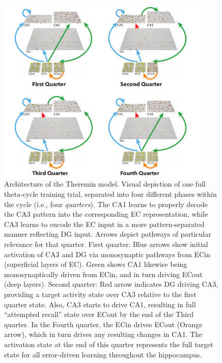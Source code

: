 \documentclass[11pt,twoside]{article}
\newif\myifpdf
\begin{document}
\begin{figure}
  \centering\includegraphics[width=4in]{fig_hip_edl_model}
  \caption{\footnotesize Architecture of the Theremin model. Visual depiction of one full theta-cycle training trial, separated into four different phases within the cycle (i.e., four \emph{quarters}).  The CA1 learns to properly decode the CA3 pattern into the corresponding EC representation, while CA3 learns to encode the EC input in a more pattern-separated manner reflecting DG input.  Arrows depict pathways of particular relevance for that quarter.  First quarter: Blue arrows show initial activation of CA3 and DG via monosynaptic pathways from ECin (superficial layers of EC).  Green shows CA1 likewise being monosynaptically driven from ECin, and in turn driving ECout (deep layers).  Second quarter: Red arrow indicates DG driving CA3, providing a target activity state over CA3 relative to the first quarter state.  Also, CA3 starts to drive CA1, resulting in full ``attempted recall'' state over ECout by the end of the Third quarter.  In the Fourth quarter, the ECin drives ECout (Orange arrow), which in turn drives any resulting changes in CA1.  The activation state at the end of this quarter represents the full target state for all error-driven learning throughout the hippocampus.}
\label{fig.theremin}
\end{figure}
\end{document}

